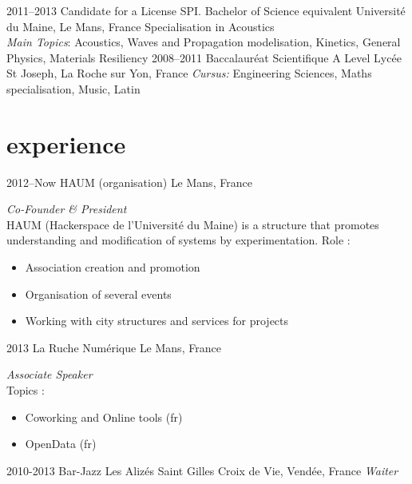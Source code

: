 \documentclass[]{friggeri-cv} %
\begin{document}
\begin{entrylist}
\entry
{2011--2013}
{{\normalfont Candidate for a License SPI.} Bachelor of Science {\normalfont equivalent}}
{Université du Maine, Le Mans, France}
{Specialisation in Acoustics \\\emph{Main Topics}: Acoustics, Waves and Propagation
modelisation, Kinetics, General Physics, Materials Resiliency}
\entry
{2008--2011}
{{\normalfont Baccalauréat Scientifique} A Level} 
{Lycée St Joseph, La Roche sur Yon, France}
{\emph{Cursus:} Engineering Sciences, Maths specialisation, Music, Latin}
\end{entrylist}


\section{experience}

\begin{entrylist}
\entry
{2012--Now}
{HAUM (organisation)}
{Le Mans, France}
{\emph{Co-Founder \& President} \\
HAUM (Hackerspace de l'Université du Maine) is a structure that promotes
understanding and modification of systems by experimentation.
Role :
\begin{itemize}
    \item Association creation and promotion
    \item Organisation of several events
    \item Working with city structures and services for projects
\end{itemize}
}
\entry
{2013}
{La Ruche Numérique}
{Le Mans, France}
{\emph{Associate Speaker}\\
Topics :
\begin{itemize}
    \item Coworking and Online tools (fr)
    \item OpenData (fr)
\end{itemize}}
\entry
{2010-2013}
{Bar-Jazz Les Alizés}
{Saint Gilles Croix de Vie, Vendée, France}
{\emph{Waiter}}
\end{entrylist}
\end{document}
